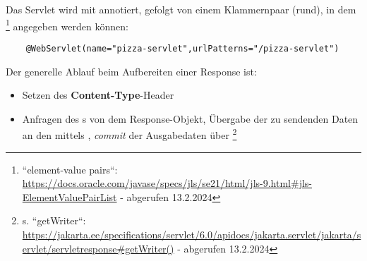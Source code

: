 Das Servlet wird mit  annotiert, gefolgt von einem Klammernpaar (rund), in dem \footnote{
``element-value pairs``: \url{https://docs.oracle.com/javase/specs/jls/se21/html/jls-9.html#jls-ElementValuePairList} - abgerufen 13.2.2024
} angegeben werden können:

\begin{verbatim}
    @WebServlet(name="pizza-servlet",urlPatterns="/pizza-servlet")
\end{verbatim}
Der generelle Ablauf beim Aufbereiten einer Response ist:

\begin{itemize}
    \item Setzen des \textbf{Content-Type}-Header
    \item Anfragen des s von dem Response-Objekt, Übergabe der zu sendenden Daten an den  mittels , \textit{commit} der Ausgabedaten über \footnote{
    s. ``getWriter``: \url{https://jakarta.ee/specifications/servlet/6.0/apidocs/jakarta.servlet/jakarta/servlet/servletresponse#getWriter()} - abgerufen 13.2.2024
    }
\end{itemize}


